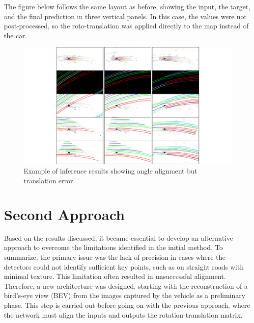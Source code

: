 The figure below follows the same layout as before, showing the input, the target, and the final prediction in three vertical panels. In this case, the values were not post-processed, so the roto-translation was applied directly to the map instead of the car.
\begin{figure}[H]
    \centering
    \includegraphics[width=1\linewidth]{Untitled 2.pdf}
    \caption{Example of inference results showing angle alignment but translation error.}
    \label{fig:inference-results}
\end{figure}


\section{Second Approach}

Based on the results discussed, it became essential to develop an alternative approach to overcome the limitations identified in the initial method. To summarize, the primary issue was the lack of precision in cases where the detectors could not identify sufficient key points, such as on straight roads with minimal texture. This limitation often resulted in unsuccessful alignment. 
Therefore, a new architecture was designed, starting with the reconstruction of a bird’s-eye view (BEV) from the images captured by the vehicle as a preliminary phase. This step is carried out before going on with the previous approach, where the network must align the inputs and outputs the rotation-translation matrix.


